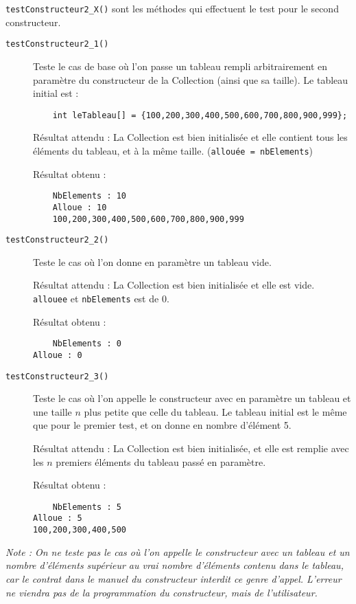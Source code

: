 \documentclass[10pt]{article}
\begin{document}
\texttt{testConstructeur2\_X()} sont les méthodes qui effectuent le test pour le second constructeur. 
\begin{description}
	\item[\texttt{testConstructeur2\_1()}] Teste le cas de base où l'on passe un tableau rempli arbitrairement en paramètre du constructeur de la Collection (ainsi que sa taille). Le tableau initial est :
	\begin{verbatim}
	int leTableau[] = {100,200,300,400,500,600,700,800,900,999};
	\end{verbatim}
	
	Résultat attendu : La Collection est bien initialisée et elle contient tous les éléments du tableau, et à la même taille. ({\tt allouée = nbElements})
	
	Résultat obtenu :
	\begin{verbatim}
	NbElements : 10
	Alloue : 10
	100,200,300,400,500,600,700,800,900,999
\end{verbatim}
	
	\item[\texttt{testConstructeur2\_2()}] Teste le cas où l'on donne en paramètre un tableau vide.
	
	Résultat attendu : La Collection est bien initialisée et elle est vide. \texttt{allouee} et \texttt{nbElements} est de 0. 
	
	Résultat obtenu :
	\begin{verbatim}
	NbElements : 0
Alloue : 0
\end{verbatim}
	
	\item[\texttt{testConstructeur2\_3()}] Teste le cas où l'on appelle le constructeur avec en paramètre un tableau et une taille $n$ plus petite que celle du tableau. Le tableau initial est le même que pour le premier test, et on donne en nombre d'élément 5.
	
	
	Résultat attendu : La Collection est bien initialisée, et elle est remplie avec les $n$ premiers éléments du tableau passé en paramètre.
	
	Résultat obtenu :
	\begin{verbatim}
	NbElements : 5
Alloue : 5
100,200,300,400,500
\end{verbatim}
\end{description}
\emph{Note : On ne teste pas le cas où l'on appelle le constructeur avec un tableau et un nombre d'éléments supérieur au vrai nombre d'éléments contenu dans le tableau, car le contrat dans le manuel du constructeur interdit ce genre d'appel. L'erreur ne viendra pas de la programmation du constructeur, mais de l'utilisateur.}
\end{document}
